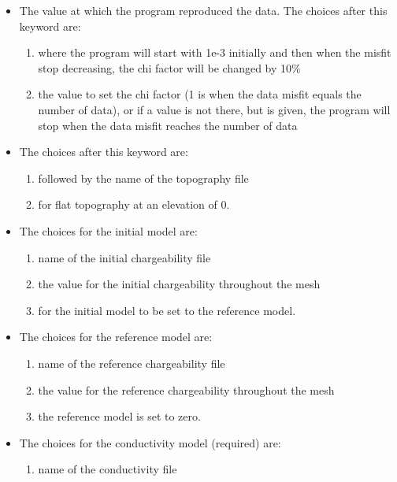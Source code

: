\begin{itemize}
%
\item [\fileName{CHIFACT}] The value at which the program reproduced the data. The choices after this keyword are: 
\begin{enumerate}
\item{} where the program will start with 1e-3 initially and then when the misfit stop decreasing, the chi factor will be changed by 10\%
\item{} the value to set the chi factor (1 is when the data misfit equals the number of data), or if a value is not there, but  is given, the program will stop when the data misfit reaches the number of data
\end{enumerate}
%
\item[\fileName{TOPO}] The choices after this keyword are:
\begin{enumerate}
\item{} followed by the name of the topography file 
\item{} for flat topography at an elevation of 0.
\end{enumerate}
%
\item[\fileName{INIT\_MOD}] The choices for the initial model are:
\begin{enumerate}
\item{} name of the initial chargeability file
\item{} the value for the initial chargeability throughout the mesh
\item{} for the initial model to be set to the reference model.
\end{enumerate}
%
\item[\fileName{REF\_MOD}] The choices for the reference model are:
\begin{enumerate}
\item{} name of the reference chargeability file
\item{} the value for the reference chargeability throughout the mesh
\item{} the reference model is set to zero.
\end{enumerate}
%
\item[\fileName{COND}] The choices for the conductivity model (required) are:
\begin{enumerate}
\item{} name of the conductivity file

\end{enumerate}
\end{itemize}
